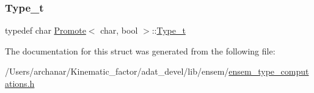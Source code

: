 \subsubsection{\texorpdfstring{Type\_t}{Type\_t}\hspace{0.1cm}{\footnotesize\ttfamily [2/2]}}
{\footnotesize\ttfamily typedef char \mbox{\hyperlink{structPromote}{Promote}}$<$ char, bool $>$\+::\mbox{\hyperlink{structPromote_3_01char_00_01bool_01_4_a8b53bc79ca8fc3ead19479e121877c8f}{Type\+\_\+t}}}



The documentation for this struct was generated from the following file\+:\begin{DoxyCompactItemize}
\item 
/\+Users/archanar/\+Kinematic\+\_\+factor/adat\+\_\+devel/lib/ensem/\mbox{\hyperlink{lib_2ensem_2ensem__type__computations_8h}{ensem\+\_\+type\+\_\+computations.\+h}}\end{DoxyCompactItemize}
